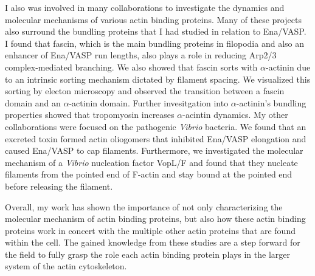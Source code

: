 I also was involved in many collaborations to investigate the dynamics and molecular mechanisms of various actin binding proteins. Many of these projects also surround the bundling proteins that I had studied in relation to Ena/VASP. I found that fascin, which is the main bundling proteins in filopodia and also an enhancer of Ena/VASP run lengths, also plays a role in reducing Arp2/3 complex-mediated branching. We also showed that fascin sorts with $\alpha$-actinin due to an intrinsic sorting mechanism dictated by filament spacing. We visualized this sorting by electon microscopy and observed the transition between a fascin domain and an $\alpha$-actinin domain. Further invesitgation into $\alpha$-actinin's bundling properties showed that tropomyosin increases $\alpha$-acintin dynamics. My other collaborations were focused on the pathogenic \textit{Vibrio} bacteria. We found that an excreted toxin formed actin oliogomers that inhibited Ena/VASP elongation and caused Ena/VASP to cap filaments. Furthermore, we investigated the molecular mechanism of a \textit{Vibrio} nucleation factor VopL/F and found that they nucleate filaments from the pointed end of F-actin and stay bound at the pointed end before releasing the filament. 

Overall, my work has shown the importance of not only characterizing the molecular mechanism of actin binding proteins, but also how these actin binding proteins work in concert with the multiple other actin proteins that are found within the cell. The gained knowledge from these studies are a step forward for the field to fully grasp the role each actin binding protein plays in the larger system of the actin cytoskeleton. 
